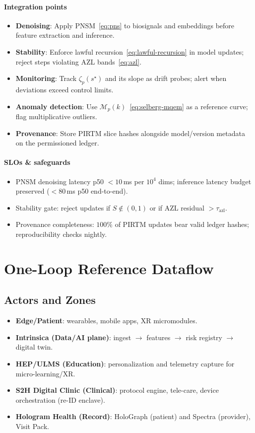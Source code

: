 \documentclass[11pt]{article}
\theoremstyle{plain}
\begin{document}
\paragraph{Integration points}
\begin{itemize}
  \item \textbf{Denoising}: Apply PNSM~\eqref{eq:pns} to biosignals and embeddings before feature extraction and inference.
  \item \textbf{Stability}: Enforce lawful recursion~\eqref{eq:lawful-recursion} in model updates; reject steps violating AZL bands~\eqref{eq:azl}.
  \item \textbf{Monitoring}: Track $\zeta_p(s^\star)$ and its slope as drift probes; alert when deviations exceed control limits.
  \item \textbf{Anomaly detection}: Use $\mathcal{M}_p(k)$~\eqref{eq:selberg-mqem} as a reference curve; flag multiplicative outliers.
  \item \textbf{Provenance}: Store PIRTM slice hashes alongside model/version metadata on the permissioned ledger.
\end{itemize}

\paragraph{SLOs \& safeguards}
\begin{itemize}
  \item PNSM denoising latency p50 $<10$\,ms per $10^4$ dims; inference latency budget preserved ($<$80\,ms p50 end-to-end).
  \item Stability gate: reject updates if $S\!\notin\!(0,1)$ or if AZL residual $>\tau_{\text{azl}}$.
  \item Provenance completeness: $100\%$ of PIRTM updates bear valid ledger hashes; reproducibility checks nightly.
\end{itemize}


\section{One-Loop Reference Dataflow}

\subsection{Actors and Zones}
\begin{itemize}
  \item \textbf{Edge/Patient}: wearables, mobile apps, XR micromodules.
  \item \textbf{Intrinsica (Data/AI plane)}: ingest $\rightarrow$ features $\rightarrow$ risk registry $\rightarrow$ digital twin.
  \item \textbf{HEP/ULMS (Education)}: personalization and telemetry capture for micro-learning/XR.
  \item \textbf{S2H Digital Clinic (Clinical)}: protocol engine, tele-care, device orchestration (re-ID enclave).
  \item \textbf{Hologram Health (Record)}: HoloGraph (patient) and Spectra (provider), Visit Pack.
\end{itemize}
\end{document}

